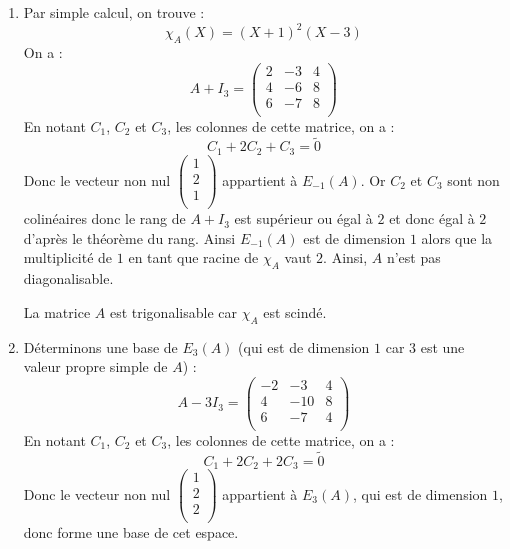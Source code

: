 \documentclass[a4paper,twoside,french,10pt]{VcCours}
\begin{document}
\begin{enumerate}
\item Par simple calcul, on trouve :
$$ \chi_A(X) = (X+1)^2(X-3)$$
On a :
$$ A+I_3 =  \begin{pmatrix}
2 & -3 & 4 \\
4 & -6 & 8 \\
6 & -7 & 8 \\
\end{pmatrix}$$
En notant $C_1$, $C_2$ et $C_3$, les colonnes de cette matrice, on a :
$$ C_1+2C_2+C_3= \tilde{0}$$
Donc le vecteur non nul $\begin{pmatrix}
1 \\
2 \\
1 \\
\end{pmatrix}$ appartient à $E_{-1}(A)$. Or $C_2$ et $C_3$ sont non colinéaires donc le rang de $A+I_3$ est supérieur ou égal à $2$ et donc égal à $2$ d'après le théorème du rang. Ainsi $E_{-1}(A)$ est de dimension $1$ alors que la multiplicité de $1$ en tant que racine de $\chi_A$ vaut $2$. Ainsi, $A$ n'est pas diagonalisable.


La matrice $A$ est trigonalisable car $\chi_A$ est scindé.
\item Déterminons une base de $E_3(A)$ (qui est de dimension $1$ car $3$ est une valeur propre simple de $A$) :
$$ A- 3I_3 = \begin{pmatrix}
-2 & -3 & 4 \\
4 & -10 & 8 \\
6 & -7 & 4 \\
\end{pmatrix}$$
En notant $C_1$, $C_2$ et $C_3$, les colonnes de cette matrice, on a :
$$ C_1+2C_2+2C_3= \tilde{0}$$
Donc le vecteur non nul $\begin{pmatrix}
1 \\
2 \\
2 \\
\end{pmatrix}$ appartient à $E_{3}(A)$, qui est de dimension $1$, donc forme une base de cet espace. 



\end{enumerate}
\end{document}

